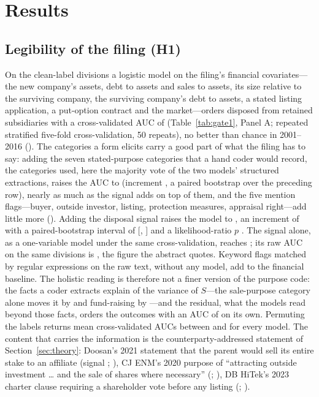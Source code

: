 \section{Results}\label{sec:results}

\subsection{Legibility of the filing (H1)}\label{sec:gate1}

On the \NGateOne{} clean-label divisions a logistic model on the filing's financial covariates---the new company's assets, debt to assets and sales to assets, its size relative to the surviving company, the surviving company's debt to assets, a stated listing application, a put-option contract and the market---orders disposed from retained subsidiaries with a cross-validated AUC of \NestedMZero{} (Table~\ref{tab:gate1}, Panel A; repeated stratified five-fold cross-validation, 50 repeats), no better than chance in 2001--2016 (\NestedMZeroOld{}). The categories a form elicits carry a good part of what the filing has to say: adding the seven stated-purpose categories that a hand coder would record, the categories  used, here the majority vote of the two models' structured extractions, raises the AUC to \NestedMOne{} (increment \NestedIncMOneMZero{}, a paired bootstrap over the preceding row), nearly as much as the signal adds on top of them, and the five mention flags---buyer, outside investor, listing, protection measures, appraisal right---add little more (\NestedMTwo{}). Adding the disposal signal raises the model to \NestedMThree{}, an increment of \NestedIncMThreeMTwo{} with a paired-bootstrap interval of [\NestedIncMThreeMTwoLo, \NestedIncMThreeMTwoHi] and a likelihood-ratio $p$ \NestedLRpMThree{}. The signal alone, as a one-variable model under the same cross-validation, reaches \NestedS{}; its raw AUC on the same divisions is \AUCPooledLLM{}, the figure the abstract quotes. Keyword flags matched by regular expressions on the raw text, without any model, add \NestedIncKOneMZero{} to the financial baseline. The holistic reading is therefore not a finer version of the purpose code: the facts a coder extracts explain \DecompRTwo{} of the variance of $S$---the sale-purpose category alone moves it by \DecompSaleCoef{} and fund-raising by \DecompFundCoef{}---and the residual, what the models read beyond those facts, orders the outcomes with an AUC of \DecompAUCResid{} on its own. Permuting the labels returns mean cross-validated AUCs between \PermAUCMin{} and \PermAUCMax{} for every model. The content that carries the information is the counterparty-addressed statement of Section~\ref{sec:theory}: Doosan's 2021 statement that the parent would sell its entire stake to an affiliate (signal \ExDoosanScore{}; \ExDoosanOutcome{}), CJ ENM's 2020 purpose of ``attracting outside investment \ldots{} and the sale of shares where necessary'' (\ExTvingScore{}; \ExTvingOutcome{}), DB HiTek's 2023 charter clause requiring a shareholder vote before any listing (\ExDBScore{}; \ExDBOutcome{}).

